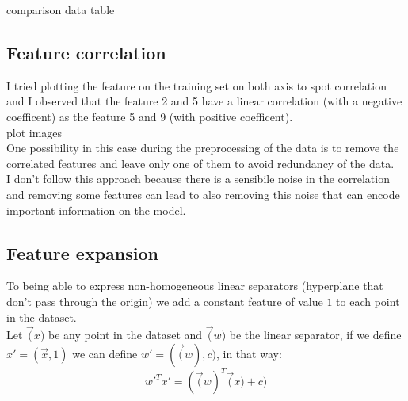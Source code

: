 comparison data table\\

\subsection{Feature correlation}
I tried plotting the feature on the training set on both axis to spot correlation and I observed that the feature 2 and 5 have a linear correlation (with a negative coefficent) as the feature 5 and 9 (with positive coefficent).\\ 

plot images\\

One possibility in this case during the preprocessing of the data is to remove the correlated features and leave only one of them to avoid redundancy of the data.\\
I don't follow this approach because there is a sensibile noise in the correlation and removing some features can lead to also removing this noise that can encode important information on the model.\\


\subsection{Feature expansion}
To being able to express non-homogeneous linear separators (hyperplane that don't pass through the origin) we add a constant feature of value $1$ to each point in the dataset.\\
Let $\vec(x)$ be any point in the dataset and $\vec(w)$ be the linear separator, if we define $x' = (\vec{x}, 1)$ we can define $w' = (\vec(w), c)$, in that way: $$w'^T x' = (\vec(w)^T \vec(x) + c)$$\\
